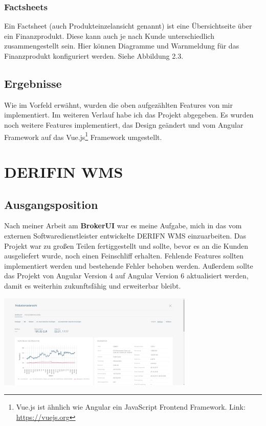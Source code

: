\documentclass[chapterprefix=false, 12pt, a4paper, oneside, parskip=half, listof=totoc, bibliography=totoc, numbers=noendperiod]{scrbook}
\begin{document}
    \subsubsection{Factsheets}

    Ein Factsheet (auch Produkteinzelansicht genannt) ist eine Übersichtseite über ein Finanzprodukt. Diese kann auch je nach Kunde unterschiedlich zusammengestellt sein.
    Hier können Diagramme und Warnmeldung für das Finanzprodukt konfiguriert werden. Siehe Abbildung 2.3.

    \subsection{Ergebnisse}

    Wie im Vorfeld erwähnt, wurden die oben aufgezählten Features von mir implementiert. Im weiteren Verlauf habe ich das Projekt
    abgegeben. Es wurden noch weitere Features implementiert, das Design geändert und vom Angular Framework
    auf das Vue.js\footnote{Vue.js ist ähnlich wie Angular ein JavaScript Frontend Framework. Link: \url{https://vuejs.org}}
    Framework umgestellt.

    \section{DERIFIN WMS}

    \subsection{Ausgangsposition}

    Nach meiner Arbeit am \textbf{BrokerUI} war es meine Aufgabe, mich in das vom externen Softwaredienstleister
    entwickelte DERIFN WMS einzuarbeiten. Das Projekt war zu großen Teilen fertiggestellt und sollte, bevor es an die
    Kunden ausgeliefert wurde, noch einen Feinschliff erhalten. Fehlende Features sollten implementiert werden und bestehende
    Fehler behoben werden. Außerdem sollte das Projekt von Angular Version 4 auf Angular Version 6 aktualisiert werden, damit
    es weiterhin zukunftsfähig und erweiterbar bleibt.

    \begin{center}
        \includegraphics[width=0.70\textwidth]{img/derifin.png}
    \end{center}
\end{document}
